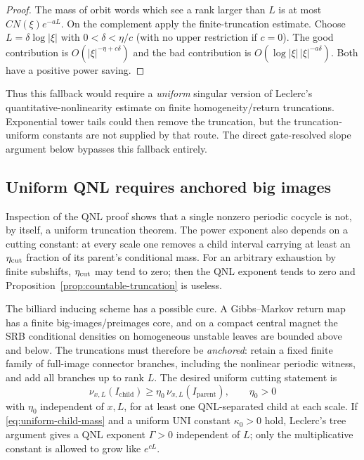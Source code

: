 \documentclass[11pt]{article}
\begin{document}
\begin{proof}
The mass of orbit words which see a rank larger than $L$ is at most
$C N(\xi)e^{-aL}$.  On the complement apply the finite-truncation estimate.
Choose $L=\delta\log|\xi|$ with $0<\delta<\eta/c$ (with no upper restriction
if $c=0$).  The good contribution is
$O(|\xi|^{-\eta+c\delta})$ and the bad contribution is
$O(\log|\xi|\,|\xi|^{-a\delta})$.  Both have a positive power saving.
\end{proof}

Thus this fallback would require a \emph{uniform} singular version of
Leclerc's quantitative-nonlinearity estimate on finite homogeneity/return
truncations.  Exponential tower tails could then remove the truncation, but
the truncation-uniform constants are not supplied by that route.  The
direct gate-resolved slope argument below bypasses this fallback entirely.

\subsection{Uniform QNL requires anchored big images}

Inspection of the QNL proof shows that a single nonzero periodic cocycle is
not, by itself, a uniform truncation theorem.  The power exponent also depends
on a cutting constant: at every scale one removes a child interval carrying
at least an $\eta_{\rm cut}$ fraction of its parent's conditional mass.  For
an arbitrary exhaustion by finite subshifts, $\eta_{\rm cut}$ may tend to
zero; then the QNL exponent tends to zero and
Proposition~\ref{prop:countable-truncation} is useless.

The billiard inducing scheme has a possible cure.  A Gibbs--Markov return map
has a finite big-images/preimages core, and on a compact central magnet the
SRB conditional densities on homogeneous unstable leaves are bounded above
and below.  The truncations must therefore be \emph{anchored}: retain a fixed
finite family of full-image connector branches, including the nonlinear
periodic witness, and add all branches up to rank $L$.  The desired uniform
cutting statement is
\begin{equation}
\label{eq:uniform-child-mass}
 \nu_{x,L}(I_{\mathrm{child}})
 \ge\eta_0\,\nu_{x,L}(I_{\mathrm{parent}}),
 \qquad \eta_0>0
\end{equation}
with $\eta_0$ independent of $x,L$, for at least one QNL-separated child at
each scale.  If \eqref{eq:uniform-child-mass} and a uniform UNI constant
$\kappa_0>0$ hold, Leclerc's tree argument gives a QNL exponent
$\Gamma>0$ independent of $L$; only the multiplicative constant is allowed
to grow like $e^{cL}$.
\end{document}
